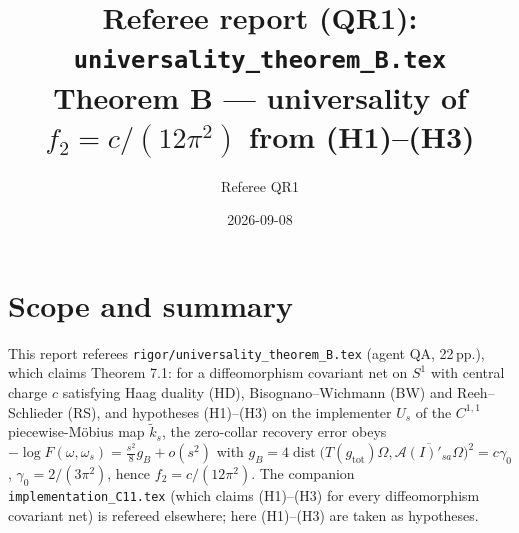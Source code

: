 \documentclass[11pt]{article}
\title{Referee report (QR1): \texttt{universality\_theorem\_B.tex}\\
\large Theorem B --- universality of $f_2=c/(12\pi^2)$ from (H1)--(H3)}
\author{Referee QR1}
\date{2026-09-08}
\newcommand{\Om}{\Omega}
\newcommand{\gtot}{g_{\mathrm{tot}}}
\begin{document}
\maketitle
\tableofcontents
\section{Scope and summary}
This report referees \texttt{rigor/universality\_theorem\_B.tex} (agent QA, 22\,pp.), which
claims Theorem 7.1: for a diffeomorphism covariant net on $S^1$ with central charge $c$
satisfying Haag duality (HD), Bisognano--Wichmann (BW) and Reeh--Schlieder (RS), and
hypotheses (H1)--(H3) on the implementer $U_s$ of the $C^{1,1}$ piecewise-M\"obius map
$\tilde k_s$, the zero-collar recovery error obeys
$-\log F(\omega,\omega_s)=\tfrac{s^2}{8}g_B+o(s^2)$ with
$g_B=4\operatorname{dist}\bigl(T(\gtot)\Om,\overline{\mathcal A(I)'_{sa}\Om}\bigr)^2=c\gamma_0$,
$\gamma_0=2/(3\pi^2)$, hence $f_2=c/(12\pi^2)$.
The companion \texttt{implementation\_C11.tex} (which claims (H1)--(H3) for every
diffeomorphism covariant net) is refereed elsewhere; here (H1)--(H3) are taken as hypotheses.
\end{document}
